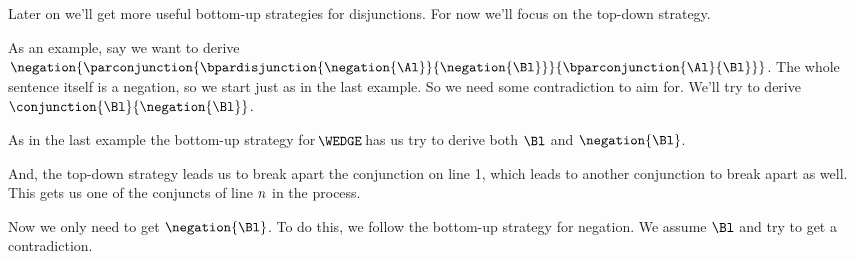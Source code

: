 Later on we'll get more useful bottom-up strategies for disjunctions. For now we'll focus on the top-down strategy. 

As an example, say we want to derive $\negation{\parconjunction{\bpardisjunction{\negation{\Al}}{\negation{\Bl}}}{\bparconjunction{\Al}{\Bl}}}$. 
The whole sentence itself is a negation, so we start just as in the last example. 
So we need some contradiction to aim for. 
We'll try to derive $\conjunction{\Bl}{\negation{\Bl}}$.
\begin{gproof}
\galineNCnd{}{}{}
\galineNCnd{}{$\qquad\vdots$}{}
\galineNCnd{}{}{}
\end{gproof}
As in the last example the bottom-up strategy for $\!\WEDGE\!$ has us try to derive both $\Bl$ and $\negation{\Bl}$.
\begin{gproof}
\galineNCnd{}{}{}
\galineNCnd{}{$\qquad\vdots$}{}
\galineNCnd{}{}{}
\end{gproof}
And, the top-down strategy leads us to break apart the conjunction on line 1, which leads to another conjunction to break apart as well. This gets us one of the conjuncts of line $n$ in the process.
\begin{gproof}
\galineNCnd{}{}{}
\galineNCnd{}{$\qquad\vdots$}{}
\galineNCnd{}{}{}
\end{gproof}
Now we only need to get $\negation{\Bl}$. 
To do this, we follow the bottom-up strategy for negation. 
We assume $\Bl$ and try to get a contradiction.
